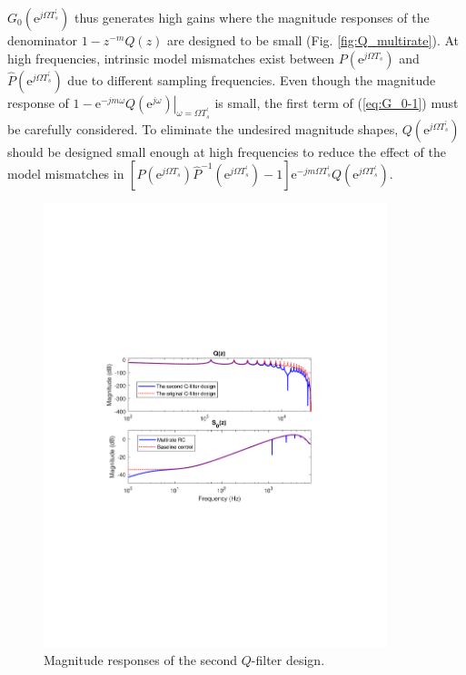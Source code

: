 \documentclass [11pt, proquest] {uwthesis}[2020/02/24]
\begin{document}
$G_{0}(\text{e}^{j\Omega T_{s}^{'}})$ thus generates high gains where
the magnitude responses of the denominator $1-z^{-m}Q(z)$ are designed
to be small (Fig. \ref{fig:Q_multirate}). At high frequencies, intrinsic
model mismatches exist between $P(\text{e}^{j\Omega T_{s}})$ and
$\hat{P}(\text{e}^{j\Omega T_{s}^{'}})$ due to different sampling
frequencies. Even though the magnitude response of $\left.1-\text{e}^{-jm\omega}Q(\text{e}^{j\omega})\right|_{\omega=\Omega T_{s}^{'}}$
is small, the first term of (\ref{eq:G_0-1}) must be carefully considered.
To eliminate the undesired magnitude shapes, $Q(\text{e}^{j\Omega T_{s}^{'}})$
should be designed small enough at high frequencies to reduce the
effect of the model mismatches in $[P(\text{e}^{j\Omega T_{s}})\hat{P}^{-1}(\text{e}^{j\Omega T_{s}^{'}})-1]\text{e}^{-jm\Omega T_{s}^{'}}Q(\text{e}^{j\Omega T_{s}^{'}})$.
\begin{figure}[!ht]
\begin{centering}
\includegraphics[width=10cm]{Fractional-order-RC/Q_S_another_Q}
\par\end{centering}
\caption{\label{fig:Magnitude-responses-of}Magnitude responses of the second
$Q$-filter design.}
\end{figure}
\end{document}
